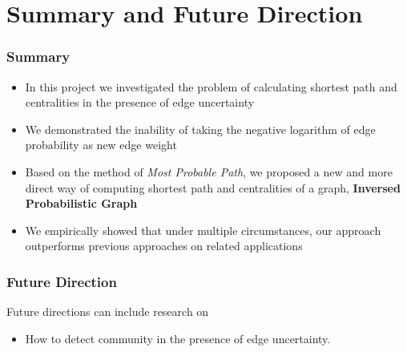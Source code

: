 \documentclass[10pt]{beamer}
\begin{document}
\section{Summary and Future Direction}
\begin{frame}
\frametitle{Summary}
\begin{itemize}
\item In this project we investigated the problem of calculating shortest path and centralities in the presence of edge uncertainty
\item We demonstrated the inability of taking the negative logarithm of edge probability as new edge weight
\item Based on the method of \textit{Most Probable Path}, we proposed a new and more direct way of computing shortest path and centralities of a graph, \textbf{Inversed Probabilistic Graph}
\item We empirically showed that under multiple circumstances, our approach outperforms previous approaches on related applications
\end{itemize}
\end{frame}

\begin{frame}
\frametitle{Future Direction}
Future directions can include research on
\begin{itemize}
\item How to detect community in the presence of edge uncertainty.
\end{itemize}
\end{frame}




\end{document}
